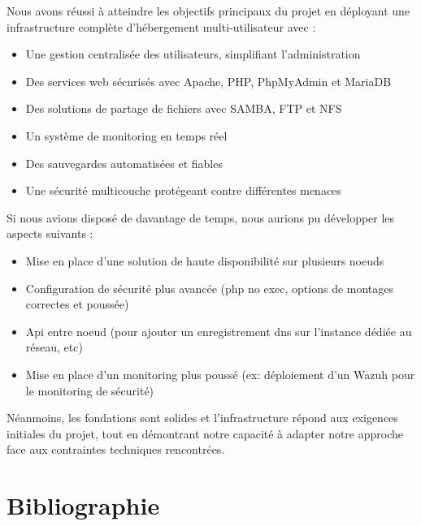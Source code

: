 \documentclass[a4paper,12pt]{article}
\begin{document}
Nous avons réussi à atteindre les objectifs principaux du projet en déployant une infrastructure complète d'hébergement multi-utilisateur avec :
\begin{itemize}
    \item Une gestion centralisée des utilisateurs, simplifiant l'administration
    \item Des services web sécurisés avec Apache, PHP, PhpMyAdmin et MariaDB
    \item Des solutions de partage de fichiers avec SAMBA, FTP et NFS
    \item Un système de monitoring en temps réel
    \item Des sauvegardes automatisées et fiables
    \item Une sécurité multicouche protégeant contre différentes menaces
\end{itemize}

Si nous avions disposé de davantage de temps, nous aurions pu développer les aspects suivants :
\begin{itemize}
    \item Mise en place d'une solution de haute disponibilité sur plusieurs noeuds
    \item Configuration de sécurité plus avancée (php no exec, options de montages correctes et poussée)
    \item Api entre noeud (pour ajouter un enregistrement dns sur l'instance dédiée au réseau, etc)
    \item Mise en place d'un monitoring plus poussé (ex: déploiement d'un Wazuh pour le monitoring de sécurité)
\end{itemize}

Néanmoins, les fondations sont solides et l'infrastructure répond aux exigences initiales du projet, tout en démontrant notre capacité à adapter notre approche face aux contraintes techniques rencontrées.

\section{Bibliographie}
\end{document}

